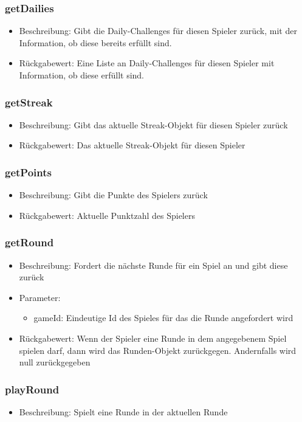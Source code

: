 \documentclass[a4paper]{scrreprt}
\begin{document}
	\subsubsection{getDailies}
	\begin{itemize}
		\item Beschreibung: Gibt die Daily-Challenges für diesen Spieler zurück, mit der Information, ob diese bereits erfüllt sind.
		\item Rückgabewert: Eine Liste an Daily-Challenges für diesen Spieler mit Information, ob diese erfüllt sind.
	\end{itemize}
	\subsubsection{getStreak}
	\begin{itemize}
		\item Beschreibung: Gibt das aktuelle Streak-Objekt für diesen Spieler zurück
		\item Rückgabewert: Das aktuelle Streak-Objekt für diesen Spieler
	\end{itemize}
	\subsubsection{getPoints}
	\begin{itemize}
		\item Beschreibung: Gibt die Punkte des Spielers zurück
		\item Rückgabewert: Aktuelle Punktzahl des Spielers
	\end{itemize}
	\subsubsection{getRound}
	\begin{itemize}
		\item Beschreibung: Fordert die nächste Runde für ein Spiel an und gibt diese zurück
		\item Parameter:
		\begin{itemize}
			\item gameId: Eindeutige Id des Spieles für das die Runde angefordert wird
		\end{itemize}
		\item Rückgabewert: Wenn der Spieler eine Runde in dem angegebenem Spiel spielen darf, dann wird das Runden-Objekt zurückgegen. Andernfalls wird null zurückgegeben
	\end{itemize}
	\subsubsection{playRound}
	\begin{itemize}
		\item Beschreibung: Spielt eine Runde in der aktuellen Runde
	\end{itemize}
\end{document}
